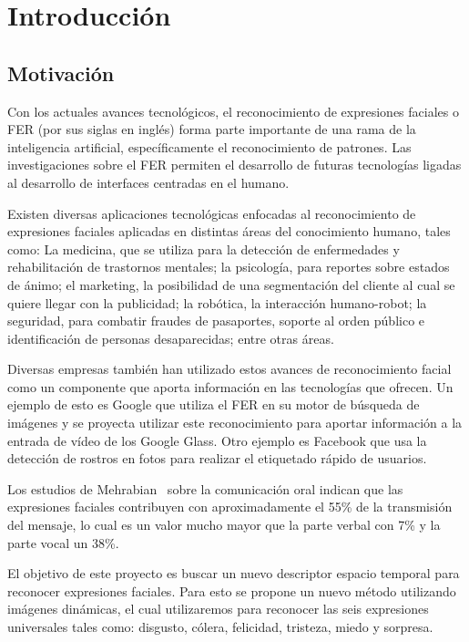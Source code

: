 \chapter[Introducción]{Introducción}
\label{ch:intro}

\section{Motivación}
\label{sec:motivacion}
Con los actuales avances tecnológicos, el reconocimiento de expresiones faciales o FER (por sus siglas en inglés) forma parte importante de una rama de la inteligencia artificial, específicamente el reconocimiento de patrones.  Las investigaciones sobre el FER permiten el desarrollo de futuras tecnologías ligadas al desarrollo de interfaces centradas en el humano. 

Existen diversas aplicaciones tecnológicas enfocadas al reconocimiento de expresiones faciales aplicadas en distintas áreas del conocimiento humano, tales como:  La medicina, que se utiliza para la detección de enfermedades y rehabilitación de trastornos mentales; la psicología, para reportes sobre estados de ánimo; el marketing, la posibilidad de una segmentación del cliente al cual se quiere llegar con la publicidad; la robótica, la interacción humano-robot; la seguridad, para combatir fraudes de pasaportes, soporte al orden público e identificación de personas desaparecidas; entre otras áreas.

Diversas empresas también han utilizado estos avances de reconocimiento facial como un componente que aporta información en las tecnologías que ofrecen. Un ejemplo de esto es  Google que utiliza el FER en su motor de búsqueda de imágenes y se proyecta utilizar este reconocimiento para aportar información a la entrada de vídeo de los Google Glass. Otro ejemplo es Facebook que usa la detección de rostros en  fotos para realizar el etiquetado rápido de usuarios.

Los estudios de Mehrabian~\cite{Mehrabian1968} sobre la comunicación oral indican que las expresiones faciales contribuyen con aproximadamente el 55\% de la transmisión del mensaje, lo cual es un valor mucho mayor que la parte verbal con 7\% y la parte vocal un 38\%.

El objetivo de este proyecto es buscar un nuevo descriptor espacio temporal para reconocer expresiones faciales. Para esto se propone un nuevo método utilizando imágenes dinámicas, el cual utilizaremos para reconocer las seis expresiones universales tales como: disgusto, cólera, felicidad, tristeza, miedo y sorpresa.

